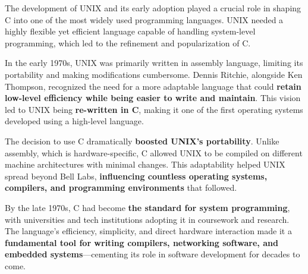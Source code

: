 \begin{NxSSSSBox}
	\begin{NxIDBox}
		The development of UNIX and its early adoption played a crucial role in shaping C into one of the most widely used programming languages. UNIX needed a highly flexible yet efficient language capable of handling system-level programming, which led to the refinement and popularization of C.
	\end{NxIDBox}
	\begin{NxIDBox}
		In the early 1970s, UNIX was primarily written in assembly language, limiting its portability and making modifications cumbersome. Dennis Ritchie, alongside Ken Thompson, recognized the need for a more adaptable language that could \textbf{retain low-level efficiency while being easier to write and maintain}. This vision led to UNIX being \textbf{re-written in C}, making it one of the first operating systems developed using a high-level language.
	\end{NxIDBox}
	\begin{NxIDBox}
		The decision to use C dramatically \textbf{boosted UNIX’s portability}. Unlike assembly, which is hardware-specific, C allowed UNIX to be compiled on different machine architectures with minimal changes. This adaptability helped UNIX spread beyond Bell Labs, \textbf{influencing countless operating systems, compilers, and programming environments} that followed.
	\end{NxIDBox}
	\begin{NxIDBox}
		By the late 1970s, C had become \textbf{the standard for system programming}, with universities and tech institutions adopting it in coursework and research. The language’s efficiency, simplicity, and direct hardware interaction made it a \textbf{fundamental tool for writing compilers, networking software, and embedded systems}—cementing its role in software development for decades to come.
	\end{NxIDBox}
\end{NxSSSSBox}

